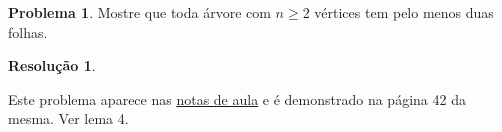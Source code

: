 \documentclass[12pt, a4paper]{article}
\theoremstyle{definition} \newtheorem{prob}{Problema}
\newtheorem*{res}{Resolução}
\begin{document}
\begin{prob} %
Mostre que toda árvore com \(n \geq 2\) vértices tem pelo menos duas folhas.

\dotfill
\begin{res}
\end{res}
Este problema aparece nas \href{https://drive.google.com/file/d/16Gy9vck48p64A-3u1t2-uUVGOVqOlAOg/view}{notas de aula} e é demonstrado na página 42 da mesma. Ver lema 4.

\end{prob}
\end{document}
